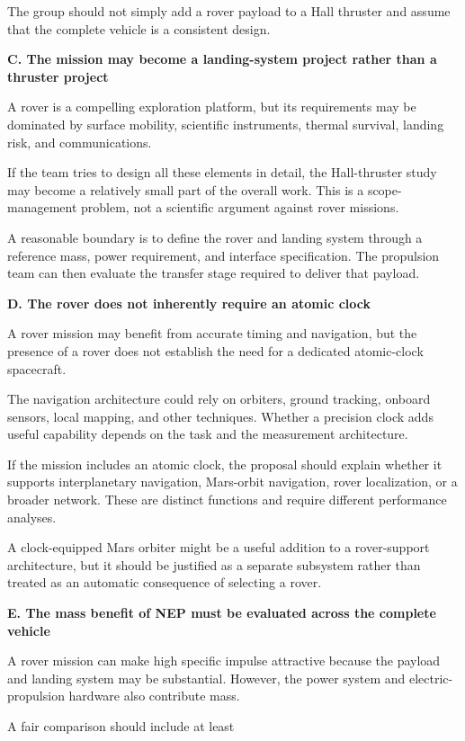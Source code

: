 The group should not simply add a rover payload to a Hall
thruster and assume that the complete vehicle is a consistent
design.

\textbf{C. The mission may become a landing-system project
	rather than a thruster project}

A rover is a compelling exploration platform, but its
requirements may be dominated by surface mobility, scientific
instruments, thermal survival, landing risk, and communications.

If the team tries to design all these elements in detail,
the Hall-thruster study may become a relatively small part
of the overall work. This is a scope-management problem,
not a scientific argument against rover missions.

A reasonable boundary is to define the rover and landing
system through a reference mass, power requirement, and
interface specification. The propulsion team can then
evaluate the transfer stage required to deliver that payload.

\textbf{D. The rover does not inherently require an
	atomic clock}

A rover mission may benefit from accurate timing and navigation,
but the presence of a rover does not establish the need for
a dedicated atomic-clock spacecraft.

The navigation architecture could rely on orbiters, ground
tracking, onboard sensors, local mapping, and other techniques.
Whether a precision clock adds useful capability depends on
the task and the measurement architecture.

If the mission includes an atomic clock, the proposal should
explain whether it supports interplanetary navigation, Mars-orbit
navigation, rover localization, or a broader network. These
are distinct functions and require different performance
analyses.

A clock-equipped Mars orbiter might be a useful addition
to a rover-support architecture, but it should be justified
as a separate subsystem rather than treated as an automatic
consequence of selecting a rover.

\textbf{E. The mass benefit of NEP must be evaluated across
	the complete vehicle}

A rover mission can make high specific impulse attractive
because the payload and landing system may be substantial.
However, the power system and electric-propulsion hardware
also contribute mass.

A fair comparison should include at least

